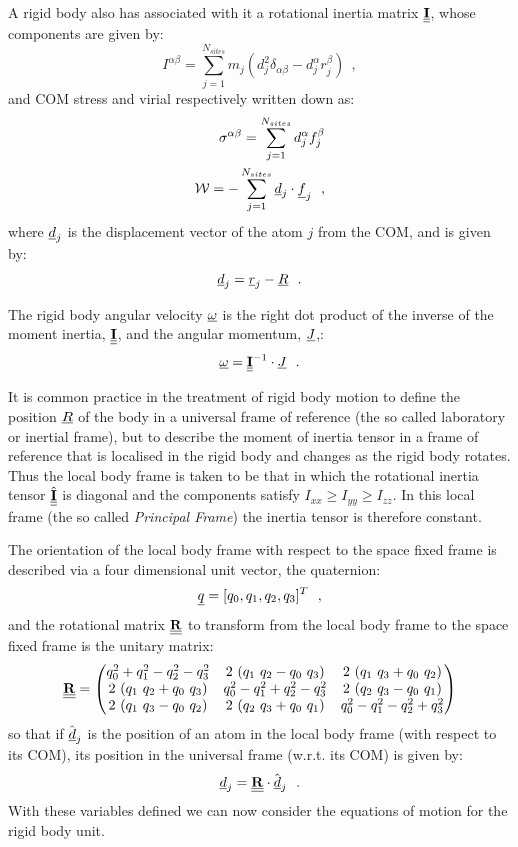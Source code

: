 A rigid body also has associated with it a
rotational inertia matrix $\mbox{$\underline{\underline{\bf I}}$}$, whose components are given by:
\begin{equation}
I^{\alpha\beta}=\sum_{j=1}^{N_{sites}} m_{j} (d_{j}^{2}
\delta_{\alpha \beta}-d_{j}^{\alpha} r_{j}^{\beta})~~,
\end{equation}
and COM stress and virial respectively written down as:
\begin{eqnarray}\label{eq:rb-stress}
\sigma^{\alpha\beta}=\sum_{j=1}^{N_{sites}} d_{j}^{\alpha} f_{j}^{\beta} \nonumber \\
{\cal W} = -\sum_{j=1}^{N_{sites}} \mbox{$\underline{d}$}_{j} \cdot \mbox{$\underline{f}$}_{j}~~,
\end{eqnarray}
where $\mbox{$\underline{d}$}_{j}$ is the displacement vector of the atom $j$ from the
COM, and is given by:
\begin{equation}
\mbox{$\underline{d}$}_{j}=\mbox{$\underline{r}$}_{j}-\mbox{$\underline{R}$}~~.
\end{equation}

The rigid body angular velocity $\mbox{$\underline{\omega}$}$ is the right dot product of the
inverse of the moment inertia, $\mbox{$\underline{\underline{\bf I}}$}$, and the angular momentum, $\mbox{$\underline{J}$}$,:
\begin{equation}
\mbox{$\underline{\omega}$} =  \mbox{$\underline{\underline{\bf I}}$}^{-1} \cdot \mbox{$\underline{J}$}~~.
\end{equation}

It is common practice in the treatment of rigid body motion to define
the position $\mbox{$\underline{R}$}$ of the body in a universal frame of reference
(the so called laboratory or inertial frame), but to describe the
moment of inertia tensor in a frame of reference that is localised
in the rigid body and changes as the rigid body rotates.  Thus the
local body frame is taken to be that in which the rotational
inertia tensor $\hat{\mbox{$\underline{\underline{\bf I}}$}}$ is diagonal and the components satisfy
$I_{xx} \ge I_{yy} \ge I_{zz}$.  In this local frame (the so called
{\em Principal Frame}) the inertia tensor is therefore constant.

The orientation of the local body frame with respect to the space fixed
frame is described via a four dimensional unit vector, the quaternion:
\begin{equation}
\mbox{$\underline{q}$} = [q_0,q_1,q_2,q_3]^T~~,
\end{equation}
and the rotational matrix $\mbox{$\underline{\underline{\bf R}}$}$ to transform from the local body
frame to the space fixed frame is the unitary matrix:
\begin{equation}
\mbox{$\underline{\underline{\bf R}}$} =
\begin{pmatrix}
 q_0^2+q_1^2-q_2^2-q_3^2 & 2~(q_1~q_2-q_0~q_3)     & 2~(q_1~q_3+q_0~q_2)     \cr
 2~(q_1~q_2+q_0~q_3)     & q_0^2-q_1^2+q_2^2-q_3^2 & 2~(q_2~q_3-q_0~q_1)     \cr
 2~(q_1~q_3-q_0~q_2)     & 2~(q_2~q_3+q_0~q_1)     & q_0^2-q_1^2-q_2^2+q_3^2 \cr
\end{pmatrix}
\end{equation}
so that if $\hat{\mbox{$\underline{d}$}}_{j}$ is the position of an atom in the local
body frame (with respect to its COM), its position in the universal frame
(w.r.t. its COM) is given by:
\begin{equation}
\mbox{$\underline{d}$}_{j} = \mbox{$\underline{\underline{\bf R}}$} \cdot \hat{\mbox{$\underline{d}$}}_{j}~~.
\end{equation}
With these variables defined we can now consider the equations of
motion for the rigid body unit.

